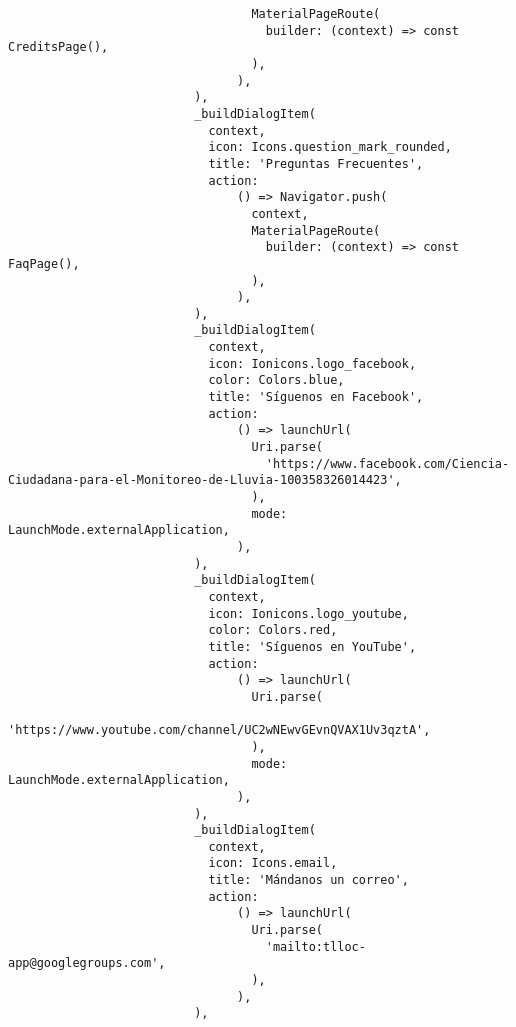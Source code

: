 \begin{verbatim}
                                  MaterialPageRoute(
                                    builder: (context) => const CreditsPage(),
                                  ),
                                ),
                          ),
                          _buildDialogItem(
                            context,
                            icon: Icons.question_mark_rounded,
                            title: 'Preguntas Frecuentes',
                            action:
                                () => Navigator.push(
                                  context,
                                  MaterialPageRoute(
                                    builder: (context) => const FaqPage(),
                                  ),
                                ),
                          ),
                          _buildDialogItem(
                            context,
                            icon: Ionicons.logo_facebook,
                            color: Colors.blue,
                            title: 'Síguenos en Facebook',
                            action:
                                () => launchUrl(
                                  Uri.parse(
                                    'https://www.facebook.com/Ciencia-Ciudadana-para-el-Monitoreo-de-Lluvia-100358326014423',
                                  ),
                                  mode: LaunchMode.externalApplication,
                                ),
                          ),
                          _buildDialogItem(
                            context,
                            icon: Ionicons.logo_youtube,
                            color: Colors.red,
                            title: 'Síguenos en YouTube',
                            action:
                                () => launchUrl(
                                  Uri.parse(
                                    'https://www.youtube.com/channel/UC2wNEwvGEvnQVAX1Uv3qztA',
                                  ),
                                  mode: LaunchMode.externalApplication,
                                ),
                          ),
                          _buildDialogItem(
                            context,
                            icon: Icons.email,
                            title: 'Mándanos un correo',
                            action:
                                () => launchUrl(
                                  Uri.parse(
                                    'mailto:tlloc-app@googlegroups.com',
                                  ),
                                ),
                          ),

\end{verbatim}
